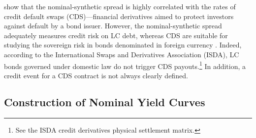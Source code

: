 {\cite{DuSchreger:2016JoF} show that the nominal-synthetic spread is highly correlated with the rates of credit default swaps (CDS)---financial derivatives aimed to protect investors against default by a bond issuer.
However, the nominal-synthetic spread adequately measures credit risk on LC debt, whereas CDS 
are suitable for studying the sovereign risk in bonds denominated in foreign currency \cite[see, for example,][]{Longstaffetal:2011}.
Indeed, according to the International Swaps and Derivatives Association (ISDA),
LC bonds governed under domestic law do not trigger CDS payouts.\footnote{ See the ISDA credit derivatives physical settlement matrix.}
In addition, a credit event for a CDS contract is not always clearly defined. %



\subsection{Construction of Nominal Yield Curves} \label{sec:YCnom}
\iftoggle{toclinks}{\gototoc}{} %

}
